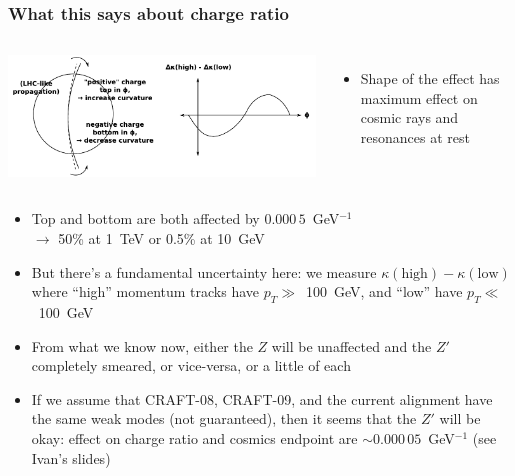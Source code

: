 \documentclass[compress]{beamer}
\begin{document}
\begin{frame}
\frametitle{What this says about charge ratio}

\begin{columns}
\includegraphics[width=\linewidth]{impact_on_charge_ratio.pdf}

\begin{itemize}
\item Shape of the effect has maximum effect on cosmic rays and resonances at rest
\end{itemize}
\end{columns}

\begin{itemize}
\item Top and bottom are both affected by $0.000\,5$~GeV$^{-1}$ \\ $\to$ 50\% at 1~TeV or 0.5\% at 10~GeV

\item But there's a fundamental uncertainty here: we measure
  $\kappa(\mbox{high}) - \kappa(\mbox{low})$ where ``high''
  momentum tracks have \mbox{$p_T \gg$ 100~GeV,} and ``low'' have \mbox{$p_T \ll$ 100~GeV}

\item From what we know now, either the $Z$ will be unaffected and the
  $Z'$ completely smeared, or vice-versa, or a little of each

\item If we assume that CRAFT-08, CRAFT-09, and the current alignment
  have the same weak modes (not guaranteed), then it seems that the
  $Z'$ will be okay: effect on charge ratio and cosmics endpoint are
  $\sim0.000\,05$~GeV$^{-1}$ (see Ivan's slides)
\end{itemize}
\end{frame}
\end{document}
